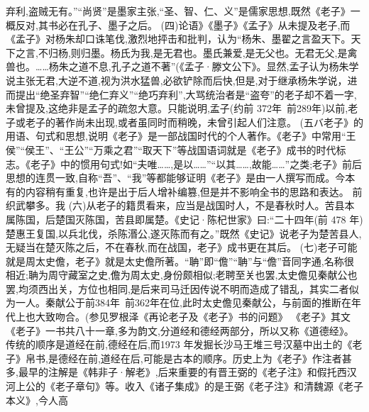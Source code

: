 \documentclass[a4paper,12pt,UTF8,twoside]{ctexbook}
\begin{document}
弃利,盗贼无有。”“尚贤”是墨家主张,“圣、智、仁、义”是儒家思想,既然《老子》一概反对,其书必在孔子、墨子之后。
(四)论语》《墨子》《孟子》从未提及老子,而《孟子》对杨朱却口诛笔伐,激烈地抨击和批判，认为“杨朱、墨翟之言盈天下。天下之言,不归杨,则归墨。杨氏为我,是无君也。墨氏兼爱,是无父也。无君无父,是禽兽也。……杨朱之道不息,孔子之道不著”(《孟子·滕文公下》。显然,孟子认为杨朱学说主张无君,大逆不道,视为洪水猛兽,必欲铲除而后快,但是,对于继承杨朱学说，进而提出“绝圣弃智”“绝仁弃义”“绝巧弃利”,大骂统治者是“盗夸”的老子却不着一字,未曾提及,这绝非是孟子的疏忽大意。只能说明,孟子(约前 372年~前289年)以前,老子或老子的著作尚未出现,或者虽同时而稍晚，未曾引起人们注意。
(五バ老子》的用语、句式和思想,说明《老子》是一部战国时代的个人著作。《老子》中常用“王侯”“侯王”、“王公”“万乘之君”“取天下”等战国语词就是《老子》成书的时代标志。《老子》中的惯用句式!如“夫唯……,是以……”“以其……,故能……”之类;老子》前后思想的连贯一致,自称“吾”、“我”等都能够证明《老子》是由一人撰写而成。今本有的内容稍有重复,也许是出于后人增补编篡,但是并不影响全书的思路和表达。
前
织武攀多。我
(六)从老子的籍贯看来，应当是战国时人，不是春秋时人。苦县本属陈国，后楚国灭陈国，苦县即属楚。《史记·陈杞世家》曰:“二十四年(前 478 年)楚惠王复国,以兵北伐，杀陈湣公,遂灭陈而有之。”既然《史记》说老子为楚苦县人,无疑当在楚灭陈之后，不在春秋,而在战国，老子》成书更在其后。
(七)老子可能就是周太史儋，老子》就是太史儋所著。“聃”即“儋”“聃”与“儋”音同字通,名称很相近;聃为周守藏室之史,儋为周太史,身份颇相似;老聘至关也罢,太史儋见秦献公也罢,均须西出关，方位也相同,是后来司马迁因传说不明而造成了错乱，其实二者似为一人。秦献公于前384年~前362年在位,此时太史儋见秦献公，与前面的推断在年代上也大致吻合。(参见罗根泽《再论老子及《老子》书的问题》
《老子》其文
《老子》一书共八十一章,多为韵文,分道经和德经两部分，所以又称《道德经》。传统的顺序是道经在前,德经在后,而1973 年发掘长沙马王堆三号汉墓中出土的《老子》帛书,是德经在前,道经在后,可能是古本的顺序。历史上为《老子》作注者甚多,最早的注解是《韩非子·解老》,后来重要的有晋王弼的《老子注》和假托西汉河上公的《老子章句》等。收入《诸子集成》的是王弼《老子注》和清魏源《老子本义》,今人高
\end{document}
